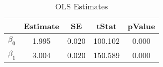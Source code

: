 \begin{table}[htb]
\centering
\caption{OLS Estimates}
\label{table:ea3:ps1:q3a:tab1}
\begin{tabular}{lcccc}
\hline
 & Estimate & SE & tStat & pValue \\
\hline\hline
$\beta_0$ & 1.995 & 0.020 & 100.102 & 0.000 \\
$\beta_1$ & 3.004 & 0.020 & 150.589 & 0.000 \\
\hline
\end{tabular}
\end{table}
